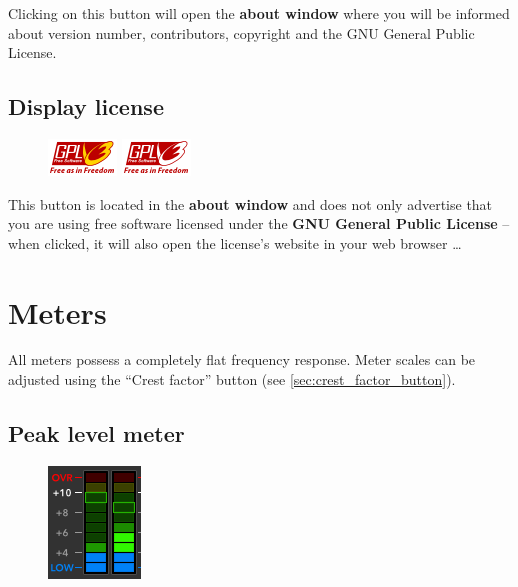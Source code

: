 Clicking on this button will open the \textbf{about window} where you
will be informed about version number, contributors, copyright and the
GNU General Public License.

\section{Display license}

\begin{figure}
\includegraphics[scale=\screenshotscale,clip]{include/images/button_gpl_on.png}
\newline \vspace{-0.9\baselineskip}
\includegraphics[scale=\screenshotscale,clip]{include/images/button_gpl_off.png}
\end{figure}

This button is located in the \textbf{about window} and does not only
advertise that you are using free software licensed under the
\textbf{GNU General Public License} -- when clicked, it will also open
the license's website in your web browser \dots

\chapter{Meters}
\label{chap:meters}

All meters possess a completely flat frequency response.  Meter scales
can be adjusted using the ``Crest factor'' button (see
\ref{sec:crest_factor_button}).

\section{Peak level meter}

\begin{figure}
\includegraphics[scale=\screenshotscale,clip]{include/images/level_meter_peak.png}
\end{figure}

